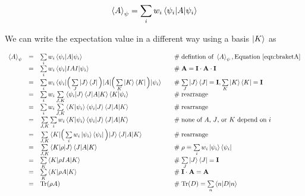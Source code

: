 \documentclass[11pt, oneside]{article}   	%
\begin{document}
\begin{equation}
\braket{A}_{\psi} = \sum\limits_{i} w_i \braket{\psi_i | A | \psi_i}
\label{eqn:braketA}
\end{equation}

\bigskip
\noindent
We can write the expectation value in a different way using a basis $\ket{K}$ as 

\begin{equation*}
\begin{array}{rcll}
\braket{A}_{\psi}
&=& \sum\limits_{i} w_i \braket{\psi_i | A | \psi_i}                                                                          
     & \quad \mathrel{\#} \text{defintion of } \braket{A}_{\psi} , \text{Equation } \ref{eqn:braketA} \\
&=& \sum\limits_{i} w_i \braket{\psi_i | I A I | \psi_i}                                                                      
     & \quad \mathrel{\#} \mathbf{A} = \mathbf{I} \cdot \mathbf{A} \cdot \mathbf{I} \\
&=& \sum\limits_{i} w_i \braket{\psi_i | \Big (  \sum\limits_{J} \ket{J} \bra{J} \Big ) |A | \Big ( \sum\limits_{K} \ket{K} \bra{K} \Big ) | \psi_i}   
     & \quad \mathrel{\#} \sum\limits_{J} \ket{J}\bra{J} = \mathbf{I}, \sum\limits_{K} \ket{K}\bra{K} = \mathbf{I} \\
&=& \sum\limits_{i} w_i \sum\limits_{J,K} \braket{\psi_i | J} \braket{J |A | K} \braket{K | \psi_i}    
     & \quad \mathrel{\#} \text{rearrange} \\
&=& \sum\limits_{i} w_i \sum\limits_{J,K}  \braket{K | \psi_i}   \braket{\psi_i | J} \braket{J |A | K} 
     & \quad \mathrel{\#} \text{rearrange} \\
&=&  \sum\limits_{J,K} \sum\limits_{i} w_i \braket{K | \psi_i}   \braket{\psi_i | J} \braket{J |A | K} 
     & \quad \mathrel{\#} \text{none of $A$, $J$, or $K$ depend on $i$} \\
&=&  \sum\limits_{J,K}  \braket{K | \Big ( \sum\limits_{i} w_i  \ket{\psi_i}\bra{\psi_i}  \Big) | J} \braket{J |A | K} 
     & \quad \mathrel{\#} \text{rearrange} \\
&=& \sum\limits_{J,K} \braket{K | \rho | J} \braket{J | A | K}
     & \quad \mathrel{\#} \rho \equiv \sum\limits_{i} w_i \ket{\psi_i} \bra{\psi_i} \\\
&=& \sum\limits_{K} \braket{K | \rho  I A | K}
     & \quad \mathrel{\#} \sum\limits_{J} \ket{J} \bra{J} = \mathbf{I} \\
&=& \sum\limits_{K} \braket{K | \rho A | K}
     & \quad \mathrel{\#}  \mathbf{I} \cdot \mathbf{A} = \mathbf{A} \\
&=&  \text{Tr}(\rho A)
     & \quad \mathrel{\#} \text{Tr}(D) = \sum\limits_{n} \braket{n | D | n}
\end{array}
\end{equation*}
\end{document}
